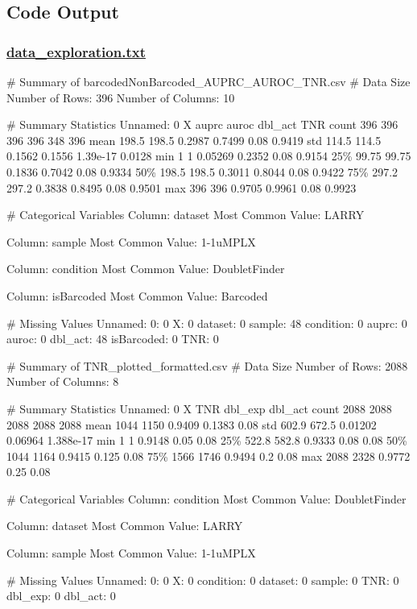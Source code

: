 \documentclass[11pt]{article}
\begin{document}
\subsection{Code Output}\hypertarget{file-data-exploration-txt}{}

\subsubsection*{\hyperlink{code-Data Exploration-data-exploration-txt}{data\_exploration.txt}}

\begin{codeoutput}
\# Summary of barcodedNonBarcoded\_AUPRC\_AUROC\_TNR.csv
\# Data Size
Number of Rows: 396
Number of Columns: 10

\# Summary Statistics
       Unnamed: 0     X   auprc  auroc  dbl\_act    TNR
count         396   396     396    396      348    396
mean        198.5 198.5  0.2987 0.7499     0.08 0.9419
std         114.5 114.5  0.1562 0.1556 1.39e-17 0.0128
min             1     1 0.05269 0.2352     0.08 0.9154
25\%         99.75 99.75  0.1836 0.7042     0.08 0.9334
50\%         198.5 198.5  0.3011 0.8044     0.08 0.9422
75\%         297.2 297.2  0.3838 0.8495     0.08 0.9501
max           396   396  0.9705 0.9961     0.08 0.9923

\# Categorical Variables
Column: dataset
Most Common Value: LARRY

Column: sample
Most Common Value: 1-1uMPLX

Column: condition
Most Common Value: DoubletFinder

Column: isBarcoded
Most Common Value: Barcoded


\# Missing Values
Unnamed: 0: 0
X: 0
dataset: 0
sample: 48
condition: 0
auprc: 0
auroc: 0
dbl\_act: 48
isBarcoded: 0
TNR: 0

\# Summary of TNR\_plotted\_formatted.csv
\# Data Size
Number of Rows: 2088
Number of Columns: 8

\# Summary Statistics
       Unnamed: 0     X     TNR  dbl\_exp   dbl\_act
count        2088  2088    2088     2088      2088
mean         1044  1150  0.9409   0.1383      0.08
std         602.9 672.5 0.01202  0.06964 1.388e-17
min             1     1  0.9148     0.05      0.08
25\%         522.8 582.8  0.9333     0.08      0.08
50\%          1044  1164  0.9415    0.125      0.08
75\%          1566  1746  0.9494      0.2      0.08
max          2088  2328  0.9772     0.25      0.08

\# Categorical Variables
Column: condition
Most Common Value: DoubletFinder

Column: dataset
Most Common Value: LARRY

Column: sample
Most Common Value: 1-1uMPLX


\# Missing Values
Unnamed: 0: 0
X: 0
condition: 0
dataset: 0
sample: 0
TNR: 0
dbl\_exp: 0
dbl\_act: 0
\end{codeoutput}
\end{document}
